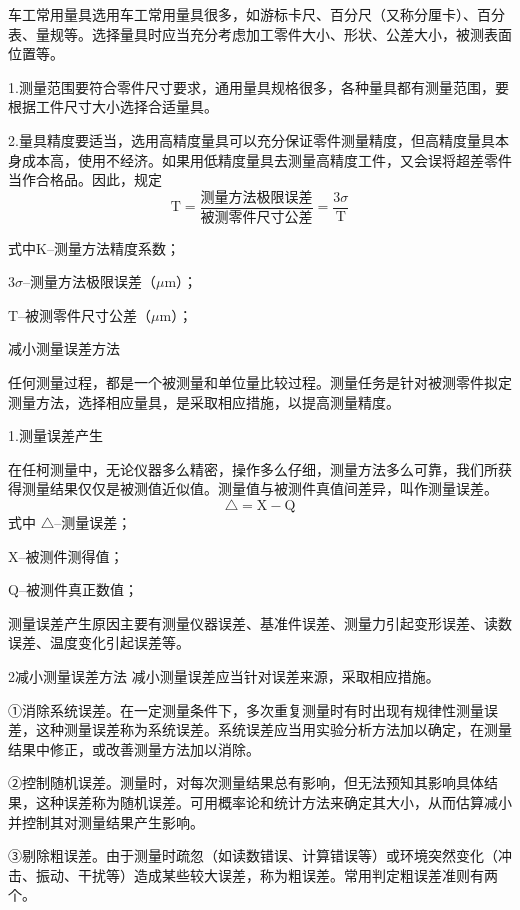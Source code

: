 \documentclass{ctexbook}
\begin{document}
车工常用量具选用车工常用量具很多，如游标卡尺、百分尺（又称分厘卡）、百分表、量规等。选择量具时应当充分考虑加工零件大小、形状、公差大小，被测表面位置等。

1.测量范围要符合零件尺寸要求，通用量具规格很多，各种量具都有测量范围，要根据工件尺寸大小选择合适量具。

2.量具精度要适当，选用高精度量具可以充分保证零件测量精度，但高精度量具本身成本高，使用不经济。如果用低精度量具去测量高精度工件，又会误将超差零件当作合格品。因此，规定
\begin{equation*}
	\text{T}=\frac{\text{测量方法极限误差}}{\text{被测零件尺寸公差}}=\frac{3\sigma}{\text{T}}
\end{equation*}

式中K--测量方法精度系数；

3$\sigma$--测量方法极限误差（$\mu$m）；

T--被测零件尺寸公差（$\mu$m）；

减小测量误差方法

任何测量过程，都是一个被测量和单位量比较过程。测量任务是针对被测零件拟定测量方法，选择相应量具，是采取相应措施，以提高测量精度。

1.测量误差产生

在任柯测量中，无论仪器多么精密，操作多么仔细，测量方法多么可靠，我们所获得测量结果仅仅是被测值近似值。测量值与被测件真值间差异，叫作测量误差。
\begin{equation*}
	\bigtriangleup =\text{X}-\text{Q}
\end{equation*}
式中 $\bigtriangleup$--测量误差；

X--被测件测得值；

Q--被测件真正数值；

测量误差产生原因主要有测量仪器误差、基准件误差、测量力引起变形误差、读数误差、温度变化引起误差等。

2减小测量误差方法
减小测量误差应当针对误差来源，采取相应措施。

①消除系统误差。在一定测量条件下，多次重复测量时有时出现有规律性测量误差，这种测量误差称为系统误差。系统误差应当用实验分析方法加以确定，在测量结果中修正，或改善测量方法加以消除。

②控制随机误差。测量时，对每次测量结果总有影响，但无法预知其影响具体结果，这种误差称为随机误差。可用概率论和统计方法来确定其大小，从而估算减小并控制其对测量结果产生影响。

③剔除粗误差。由于测量时疏忽（如读数错误、计算错误等）或环境突然变化（冲击、振动、干扰等）造成某些较大误差，称为粗误差。常用判定粗误差准则有两个。
\end{document}
